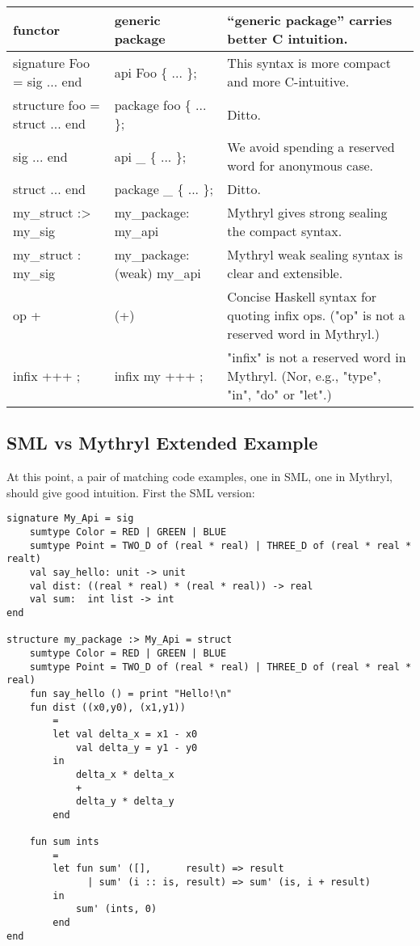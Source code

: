 \begin{tabular}{|l|l|l|}
functor & generic package &  ``generic package'' carries better C intuition. \\ \hline
signature Foo = sig ... end & api Foo \{ ... \}; & This syntax is more compact and more C-intuitive. \\ \hline
structure foo = struct ... end & package foo \{ ... \}; & Ditto. \\ \hline
sig ... end & api \_ \{ ... \}; & We avoid spending a reserved word for anonymous case. \\ \hline
struct ... end & package \_ \{ ... \}; & Ditto. \\ \hline
my\_struct :> my\_sig & my\_package: my\_api & Mythryl gives strong sealing the compact syntax. \\ \hline
my\_struct : my\_sig & my\_package: (weak) my\_api & Mythryl weak sealing syntax is clear and extensible. \\ \hline
op + & (+) & Concise Haskell syntax for quoting infix ops. ("op" is not a reserved word in Mythryl.) \\ \hline
infix +++ ; & infix my +++ ; & "infix" is not a reserved word in Mythryl. (Nor, e.g., "type", "in", "do" or "let".) \\ \hline
\end{tabular}
\cutend*

\subsection{SML vs Mythryl Extended Example}
At this point, a pair of matching code examples, one in SML, one in Mythryl, should 
give good intuition.  First the SML version:

\begin{verbatim}
signature My_Api = sig
    sumtype Color = RED | GREEN | BLUE
    sumtype Point = TWO_D of (real * real) | THREE_D of (real * real * realt)
    val say_hello: unit -> unit
    val dist: ((real * real) * (real * real)) -> real
    val sum:  int list -> int
end

structure my_package :> My_Api = struct
    sumtype Color = RED | GREEN | BLUE
    sumtype Point = TWO_D of (real * real) | THREE_D of (real * real * real)
    fun say_hello () = print "Hello!\n"
    fun dist ((x0,y0), (x1,y1))
        =
        let val delta_x = x1 - x0
            val delta_y = y1 - y0
        in
            delta_x * delta_x
            +
            delta_y * delta_y
        end

    fun sum ints
        =
        let fun sum' ([],      result) => result
              | sum' (i :: is, result) => sum' (is, i + result)
        in
            sum' (ints, 0)
        end
end
\end{verbatim}


